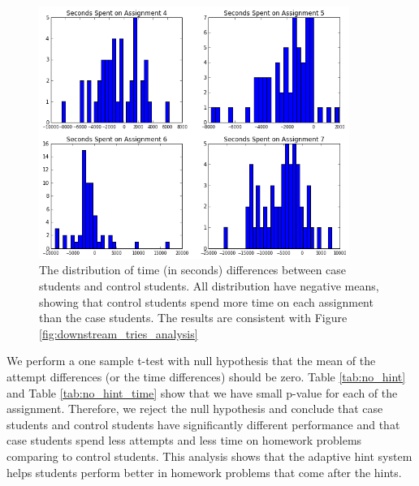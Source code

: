 \documentclass{llncs2e/llncs}
\begin{document}
\begin{figure}[ht]
\centering
\includegraphics[width=0.9\textwidth]{image/assignment_time_downstream.png}
\caption{The distribution of time (in seconds) differences between case students and control students. All distribution have negative means, showing that control students spend more time on each assignment than the case students. The results are consistent with Figure \ref{fig:downstream_tries_analysis}}
    \label{fig:downstream_time_analysis}
\end{figure}

We perform a one sample t-test with null hypothesis that the mean of the attempt differences (or the time differences) should be zero. Table \ref{tab:no_hint} and Table \ref{tab:no_hint_time} show that we have small p-value for each of the assignment. Therefore, we reject the null hypothesis and conclude that case students and control students have significantly different performance and that case students spend less attempts and less time on homework problems comparing to control students. This analysis shows that the adaptive hint system helps students perform better in homework problems that come after the hints. 
\end{document}
